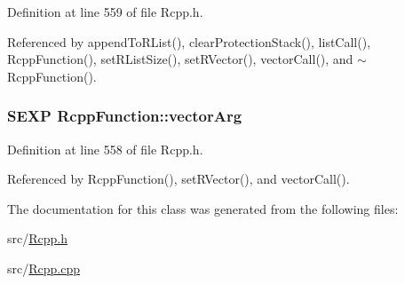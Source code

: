 Definition at line 559 of file Rcpp.h.

Referenced by appendToRList(), clearProtectionStack(), listCall(), RcppFunction(), setRListSize(), setRVector(), vectorCall(), and $\sim$RcppFunction().\hypertarget{classRcppFunction_a0492c128c0f72cda44e679265b36b50e}{
\subsubsection[{vectorArg}]{\setlength{\rightskip}{0pt plus 5cm}SEXP {\bf RcppFunction::vectorArg}}}
\label{classRcppFunction_a0492c128c0f72cda44e679265b36b50e}


Definition at line 558 of file Rcpp.h.

Referenced by RcppFunction(), setRVector(), and vectorCall().

The documentation for this class was generated from the following files:\begin{DoxyCompactItemize}
\item 
src/\hyperlink{Rcpp_8h}{Rcpp.h}\item 
src/\hyperlink{Rcpp_8cpp}{Rcpp.cpp}\end{DoxyCompactItemize}
